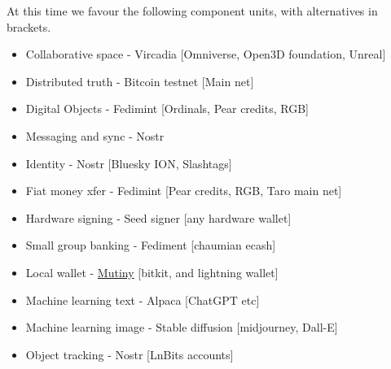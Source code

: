 At this time we favour the following component units, with alternatives in brackets.
\begin{itemize}
\item Collaborative space - Vircadia [Omniverse, Open3D foundation, Unreal]
\item Distributed truth - Bitcoin testnet [Main net]
\item Digital Objects - Fedimint [Ordinals, Pear credits, RGB]
\item Messaging and sync - Nostr 
\item Identity - Nostr [Bluesky ION, Slashtags]
\item Fiat money xfer - Fedimint [Pear credits, RGB, Taro main net]
\item Hardware signing - Seed signer [any hardware wallet]
\item Small group banking - Fediment [chaumian ecash]
\item Local wallet - \href{https://app.mutinywallet.com/}{Mutiny} [bitkit, and lightning wallet]
\item Machine learning text - Alpaca [ChatGPT etc]
\item Machine learning image - Stable diffusion [midjourney, Dall-E]
\item Object tracking - Nostr [LnBits accounts]
\end{itemize}

